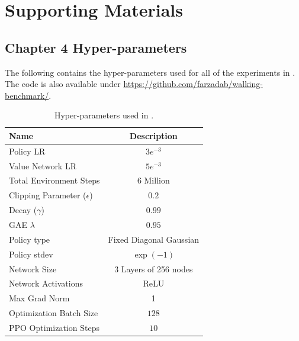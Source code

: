 \setcounter{chapter}{-1}
\chapter{Supporting Materials}
\renewcommand{\thechapter}{A}




\section{Chapter 4 Hyper-parameters}
\label{sec:envparam_hyperparams}

The following contains the hyper-parameters used for all of the experiments in . The code is also available under \url{https://github.com/farzadab/walking-benchmark/}.
\begin{table}[h]
    \centering
    \begin{tabular}{lc}
        \toprule
        Name & Description \\
        \midrule
        Policy LR & $3e^{-3}$\\
        Value Network LR & $5e^{-3}$\\
        Total Environment Steps & $6$ Million\\
        Clipping Parameter ($\epsilon$) & $0.2$\\
        Decay ($\gamma$) & $0.99$\\
        GAE $\lambda$ & $0.95$ \\
        Policy type & Fixed Diagonal Gaussian\\
        Policy stdev & $\exp(-1)$\\
        Network Size & 3 Layers of 256 nodes \\
        Network Activations & ReLU \\
        Max Grad Norm & 1\\
        Optimization Batch Size & $128$ \\
        PPO Optimization Steps & $10$ \\
        \bottomrule
    \end{tabular}
    \caption{Hyper-parameters used in .}
    \label{tab:envparam_hyperparams}
\end{table}


